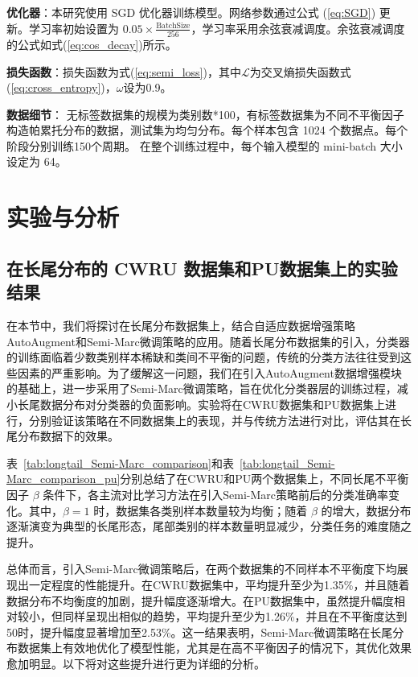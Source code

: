 \documentclass[master]{thesis-uestc}
\begin{document}
\textbf{优化器}：本研究使用 SGD 优化器训练模型。网络参数通过公式 (\ref{eq:SGD}) 更新。学习率初始设置为 \( 0.05 \times \frac{\text{BatchSize}}{256} \)，学习率采用余弦衰减调度。余弦衰减调度的公式如式(\ref{eq:cos_decay})所示。

\textbf{损失函数}：损失函数为式(\ref{eq:semi_loss})，其中$\mathcal{L}$为交叉熵损失函数式(\ref{eq:cross_entropy})，$\omega$设为0.9。

\textbf{数据细节}：
无标签数据集的规模为类别数*100，有标签数据集为不同不平衡因子构造帕累托分布的数据，测试集为均匀分布。每个样本包含 1024 个数据点。每个阶段分别训练150个周期。
在整个训练过程中，每个输入模型的 mini-batch 大小设定为 64。
\FloatBarrier  %

\section{实验与分析}

\subsection{在长尾分布的 CWRU 数据集和PU数据集上的实验结果}
在本节中，我们将探讨在长尾分布数据集上，结合自适应数据增强策略AutoAugment和Semi-Marc微调策略的应用。随着长尾分布数据集的引入，分类器的训练面临着少数类别样本稀缺和类间不平衡的问题，传统的分类方法往往受到这些因素的严重影响。为了缓解这一问题，我们在引入AutoAugment数据增强模块的基础上，进一步采用了Semi-Marc微调策略，旨在优化分类器层的训练过程，减小长尾数据分布对分类器的负面影响。实验将在CWRU数据集和PU数据集上进行，分别验证该策略在不同数据集上的表现，并与传统方法进行对比，评估其在长尾分布数据下的效果。

表~\ref{tab:longtail_Semi-Marc_comparison}和表~\ref{tab:longtail_Semi-Marc_comparison_pu}分别总结了在CWRU和PU两个数据集上，不同长尾不平衡因子 \(\beta\) 条件下，各主流对比学习方法在引入Semi-Marc策略前后的分类准确率变化。其中，\(\beta=1\) 时，数据集各类别样本数量较为均衡；随着 \(\beta\) 的增大，数据分布逐渐演变为典型的长尾形态，尾部类别的样本数量明显减少，分类任务的难度随之提升。

总体而言，引入Semi-Marc微调策略后，在两个数据集的不同样本不平衡度下均展现出一定程度的性能提升。在CWRU数据集中，平均提升至少为1.35\%，并且随着数据分布不均衡度的加剧，提升幅度逐渐增大。在PU数据集中，虽然提升幅度相对较小，但同样呈现出相似的趋势，平均提升至少为1.26\%，并且在不平衡度达到50时，提升幅度显著增加至2.53\%。这一结果表明，Semi-Marc微调策略在长尾分布数据集上有效地优化了模型性能，尤其是在高不平衡因子的情况下，其优化效果愈加明显。以下将对这些提升进行更为详细的分析。
\end{document}
